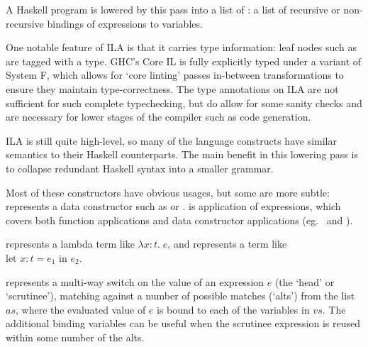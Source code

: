 \documentclass[dissertation.tex]{subfiles}
\begin{document}
{{{            A Haskell program is lowered by this pass into a list of : a list of recursive or
            non-recursive bindings of expressions to variables.


            One notable feature of ILA is that it carries type information: leaf nodes such as  are
            tagged with a type. GHC's Core IL is fully explicitly typed under a variant of System F, which allows for
            `core linting' passes in-between transformations to ensure they maintain type-correctness. The type
            annotations on ILA are not sufficient for such complete typechecking, but do allow for some sanity checks
            and are necessary for lower stages of the compiler such as code generation. 

            ILA is still quite high-level, so many of the language constructs have similar semantics to their Haskell
            counterparts. The main benefit in this lowering pass is to collapse redundant Haskell syntax into a smaller
            grammar.

            Most of these constructors have obvious usages, but some are more subtle:  represents a data
            constructor such as  or .  is application of expressions, which
            covers both function applications and data constructor applications (eg.\  and ).

             represents a lambda term like \(\lambda x : t.\;e\), and  represents a term like \(\text{let } x:t = e_1 \text{ in } e_2\).

            
             represents a multi-way switch on the value of an expression \(e\) (the
            `head' or `scrutinee'), matching against a number of possible matches (`alts') from the list \(as\), where
            the evaluated value of \(e\) is bound to each of the variables in \(vs\). The additional binding variables
            can be useful when the scrutinee expression is reused within some number of the alts.

}}}
\end{document}
